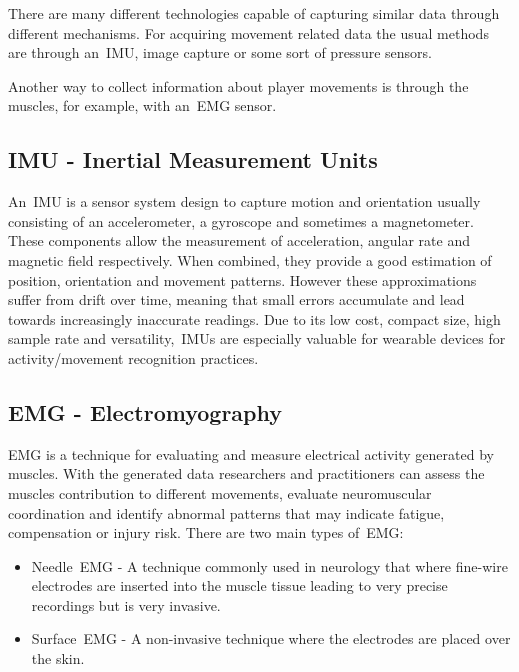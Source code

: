There are many different technologies capable of capturing similar data through different mechanisms. %
For acquiring movement related data the usual methods are through an~\gls{IMU}, image capture or some sort of pressure sensors.

Another way to collect information about player movements is through the muscles, for example, with an~\gls{EMG} sensor.


\subsection{\gls{IMU} - Inertial Measurement Units}
\label{ssec:imu_STA}

An~\gls{IMU} is a sensor system design to capture motion and orientation usually consisting of an accelerometer, a gyroscope and sometimes a magnetometer. These components allow the measurement of acceleration, angular rate and 
magnetic field respectively. When combined, they provide a good estimation of position, orientation and movement patterns. However these approximations suffer from drift over time, meaning that small errors accumulate 
and lead towards increasingly inaccurate readings. Due to its low cost, compact size, high sample rate and versatility,~\glspl{IMU} are especially valuable for wearable devices for activity/movement recognition practices.

\subsection{\gls{EMG} - Electromyography}
\label{ssec:emg_STA}

\gls{EMG} is a technique for evaluating and measure electrical activity generated by muscles. With the generated data researchers and practitioners can assess the muscles contribution to different movements, evaluate neuromuscular 
coordination and identify abnormal patterns that may indicate fatigue, compensation or injury risk.
There are two main types of~\gls{EMG}:

\begin{itemize}
  \item Needle~\gls{EMG} - A technique commonly used in neurology that where fine-wire electrodes are inserted into the muscle tissue leading to very precise recordings but is very invasive.
  \item Surface~\gls{EMG} - A non-invasive technique where the electrodes are placed over the skin.
\end{itemize}


